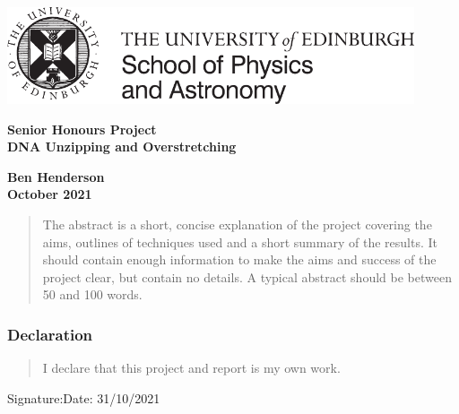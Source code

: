 \documentclass[a4paper,12pt]{article}
\begin{document}
\pagestyle{empty}                       %

\par\noindent\includegraphics[width=12cm]{PandA_crest.pdf}

\par\noindent                                           %
\vspace*{2cm}
\begin{center}
        \Large\bf \Large\bf Senior Honours Project\\
        \LARGE\bf DNA Unzipping and Overstretching
\end{center}
\vspace*{0.5cm}
\begin{center}
        \bf Ben Henderson\\                               %
        October 2021                                   %
\end{center}
\vspace*{5mm}
%
\begin{abstract}
        The abstract is a short, concise explanation of the project
        covering the aims, outlines of techniques used and a short
        summary of the results. It should contain enough information to
        make the aims and success of the project clear, but contain no details.
        A typical abstract should be between 50 and 100 words.
\end{abstract}

\vspace*{1cm}

\subsubsection*{Declaration}

\begin{quotation}
  I declare that this project and report is my own work.
\end{quotation}

\vspace*{2cm}
Signature:\hspace*{8cm}Date:  31/10/2021         %
\end{document}
